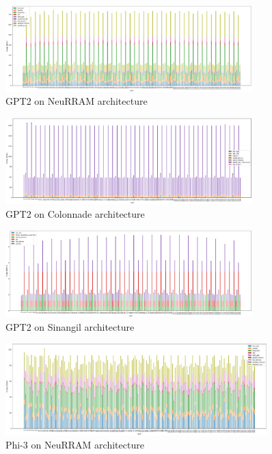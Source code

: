 \documentclass[conference]{IEEEtran}
\begin{document}

\onecolumn
\begin{center}
\begin{figure}[ht]
    \centering
    \includegraphics[width=0.85\textwidth]{images/gpt2_wan_arch.jpg}
    \caption{GPT2 on NeuRRAM architecture}
    \label{fig:gpt2_wan}
\end{figure}

\begin{figure}[ht]
    \centering
    \includegraphics[width=0.85\textwidth]{images/gpt2_colonnade.png}
    \caption{GPT2 on Colonnade architecture}
    \label{fig:gpt2_sinangil}
\end{figure}

\begin{figure}[ht]
    \centering
    \includegraphics[width=0.85\textwidth]{images/gpt2_sinangil.png}
    \caption{GPT2 on Sinangil architecture}
    \label{fig:gpt2_colonnade}
\end{figure}

\begin{figure}[ht]
    \centering
    \includegraphics[width=0.9\textwidth]{images/phi3_wan_arch.jpg}
    \caption{Phi-3 on NeuRRAM architecture}
    \label{fig:phi3_wan}
\end{figure}


\end{center}
\end{document}
